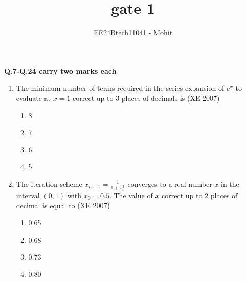 \documentclass[journal,12pt,onecolumn]{IEEEtran}
\theoremstyle{remark}
\begin{document}
\title{gate 1}
\author{EE24Btech11041 - Mohit}
\maketitle
\renewcommand{\thefigure}{\theenumi}
\renewcommand{\thetable}{\theenumi}
\textbf{Q.7-Q.24 carry two marks each}

\begin{enumerate}
    \item The minimum number of terms required in the series expansion of $e^x$ to evaluate at $x = 1$ correct up to 3 places of decimals is
    \hfill{(XE 2007)}
    \begin{multicols}{4}
    \begin{enumerate}
        \item 8
        \item 7
        \item 6
        \item 5
    \end{enumerate}
\end{multicols}
    \item The iteration scheme $x_{n+1} = \frac{1}{1 + x_n^2}$ converges to a real number $x$ in the interval $(0, 1)$ with $x_0 = 0.5$. The value of $x$ correct up to 2 places of decimal is equal to
\hfill{(XE 2007)}
 \begin{multicols}{4}
    \begin{enumerate}
        \item 0.65
        \item 0.68
        \item 0.73
        \item 0.80
    \end{enumerate}
    \end{multicols}


\end{enumerate}
\end{document}
